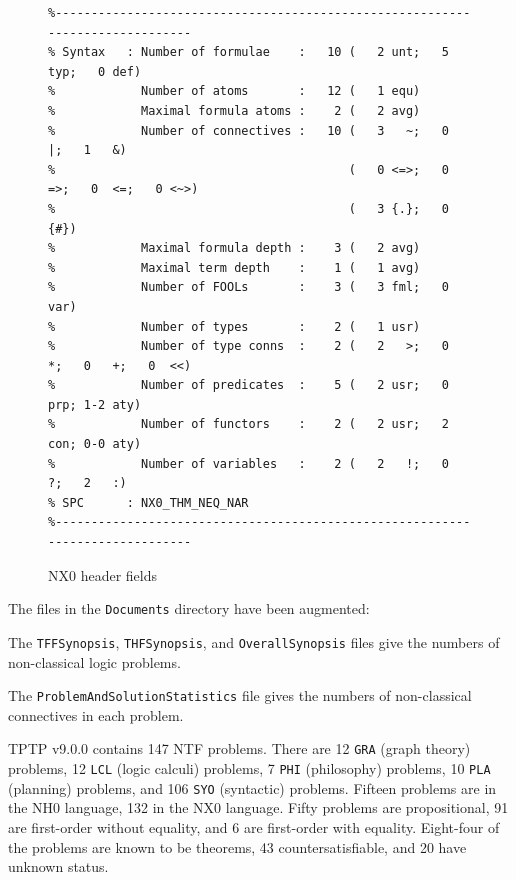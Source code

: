 \documentclass{ceurart}
\newenvironment{packed_itemize}{
\vspace*{-0.3em}
\begin{itemize}
\setlength{\partopsep}{0pt}
\setlength{\itemsep}{1pt}
\setlength{\parskip}{0pt}
\setlength{\parsep}{0pt}
}{\end{itemize}}
\begin{document}
\begin{figure}[h!]
\small
{}
\begin{verbatim}
%------------------------------------------------------------------------------
% Syntax   : Number of formulae    :   10 (   2 unt;   5 typ;   0 def)
%            Number of atoms       :   12 (   1 equ)
%            Maximal formula atoms :    2 (   2 avg)
%            Number of connectives :   10 (   3   ~;   0   |;   1   &)
%                                         (   0 <=>;   0  =>;   0  <=;   0 <~>)
%                                         (   3 {.};   0 {#})
%            Maximal formula depth :    3 (   2 avg)
%            Maximal term depth    :    1 (   1 avg)
%            Number of FOOLs       :    3 (   3 fml;   0 var)
%            Number of types       :    2 (   1 usr)
%            Number of type conns  :    2 (   2   >;   0   *;   0   +;   0  <<)
%            Number of predicates  :    5 (   2 usr;   0 prp; 1-2 aty)
%            Number of functors    :    2 (   2 usr;   2 con; 0-0 aty)
%            Number of variables   :    2 (   2   !;   0   ?;   2   :)
% SPC      : NX0_THM_NEQ_NAR
%------------------------------------------------------------------------------
\end{verbatim}
\caption{NX0 header fields}
\label{NX0Header}
\end{figure}

The files in the {\tt Documents} directory have been augmented:
\begin{packed_itemize}
\item The {\tt TFFSynopsis}, {\tt THFSynopsis}, and {\tt OverallSynopsis} files give the numbers 
      of non-classical logic problems.
\item The {\tt ProblemAndSolutionStatistics} file gives the numbers of non-classical
      connectives in each problem.
\end{packed_itemize}

TPTP v9.0.0 contains 147 NTF problems.
There are 
12 {\tt GRA} (graph theory) problems, 
12 {\tt LCL} (logic calculi) problems, 
7 {\tt PHI} (philosophy) problems,
10 {\tt PLA} (planning) problems, 
and 
106 {\tt SYO} (syntactic) problems.
Fifteen problems are in the NH0 language, 132 in the NX0 language.
Fifty problems are propositional, 91 are first-order without equality, and 6 are
first-order with equality.
Eight-four of the problems are known to be theorems, 43 countersatisfiable, and 20 have unknown
status.

\end{document}
